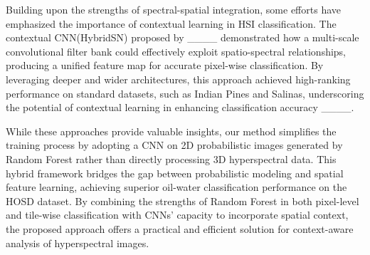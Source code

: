 Building upon the strengths of spectral-spatial integration, some efforts have emphasized the importance of contextual learning in HSI classification. The contextual CNN(HybridSN) proposed by ____ demonstrated how a multi-scale convolutional filter bank could effectively exploit spatio-spectral relationships, producing a unified feature map for accurate pixel-wise classification. By leveraging deeper and wider architectures, this approach achieved high-ranking performance on standard datasets, such as Indian Pines and Salinas, underscoring the potential of contextual learning in enhancing classification accuracy ____.

While these approaches provide valuable insights, our method simplifies the training process by adopting a CNN on 2D probabilistic images generated by Random Forest rather than directly processing 3D hyperspectral data. This hybrid framework bridges the gap between probabilistic modeling and spatial feature learning, achieving superior oil-water classification performance on the HOSD dataset. By combining the strengths of Random Forest in both pixel-level and tile-wise classification with CNNs’ capacity to incorporate spatial context, the proposed approach offers a practical and efficient solution for context-aware analysis of hyperspectral images.